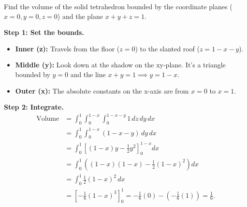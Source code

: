 \begin{example}
Find the volume of the solid tetrahedron bounded by the coordinate planes ($x=0, y=0, z=0$) and the plane $x + y + z = 1$.

\begin{center}
\end{center}

\textbf{Step 1: Set the bounds.}
\begin{itemize}
    \item \textbf{Inner (z):} Travels from the floor ($z=0$) to the slanted roof ($z = 1 - x - y$).
    \item \textbf{Middle (y):} Look down at the shadow on the xy-plane. It's a triangle bounded by $y=0$ and the line $x+y=1 \implies y = 1 - x$.
    \item \textbf{Outer (x):} The absolute constants on the x-axis are from $x=0$ to $x=1$.
\end{itemize}

\textbf{Step 2: Integrate.}
\begin{align*}
\text{Volume} &= \int_0^1 \int_0^{1-x} \int_0^{1-x-y} 1 \, dz \, dy \, dx \\
&= \int_0^1 \int_0^{1-x} (1 - x - y) \, dy \, dx \\
&= \int_0^1 \left[ (1-x)y - \frac{1}{2}y^2 \right]_0^{1-x} dx \\
&= \int_0^1 \left( (1-x)(1-x) - \frac{1}{2}(1-x)^2 \right) dx \\
&= \int_0^1 \frac{1}{2}(1-x)^2 \, dx \\
&= \left[ -\frac{1}{6}(1-x)^3 \right]_0^1 = -\frac{1}{6}(0) - \left(-\frac{1}{6}(1)\right) = \frac{1}{6}.
\end{align*}
\end{example}